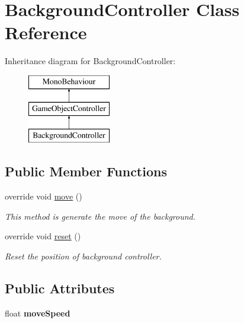 \hypertarget{class_background_controller}{}\section{Background\+Controller Class Reference}
\label{class_background_controller}
Inheritance diagram for Background\+Controller\+:\begin{figure}[H]
\begin{center}
\leavevmode
\includegraphics[height=3.000000cm]{class_background_controller}
\end{center}
\end{figure}
\subsection*{Public Member Functions}
\begin{DoxyCompactItemize}
\item 
override void \hyperlink{class_background_controller_ac4b0d540fa72d7c57e919c309bb8f167}{move} ()
\begin{DoxyCompactList}\small\item\em This method is generate the move of the background. \end{DoxyCompactList}\item 
override void \hyperlink{class_background_controller_a39841506fc252b3515273a58df8b852f}{reset} ()
\begin{DoxyCompactList}\small\item\em Reset the position of background controller. \end{DoxyCompactList}\end{DoxyCompactItemize}
\subsection*{Public Attributes}
\begin{DoxyCompactItemize}
\item 
\hypertarget{class_background_controller_ae19cb26cc69a10ecb9ee01f316611dc7}{}\label{class_background_controller_ae19cb26cc69a10ecb9ee01f316611dc7} 
float {\bfseries move\+Speed}
\end{DoxyCompactItemize}
